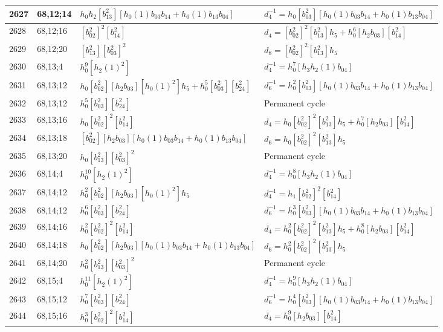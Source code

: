 \documentclass{article}
\begin{document}
\begin{longtable}{|l|l|>{\raggedright\arraybackslash}p{6cm}|>{\raggedright\arraybackslash}p{6cm}|}
\hline
2627 & 68,12;14 & $h_0h_2[b_{13}^2][h_0(1)b_{03}b_{14} + h_0(1)b_{13}b_{04}]$ & $d_{4}^{-1}=h_0[b_{03}^2][h_0(1)b_{03}b_{14} + h_0(1)b_{13}b_{04}]$\\
\hline
2628 & 68,12;16 & $[b_{02}^2]^2[b_{14}^2]$ &$d_{4}=[b_{02}^2]^2[b_{13}^2]h_5 + h_0^6[h_2b_{03}][b_{14}^2]$\\
\hline
2629 & 68,12;20 & $[b_{13}^2][b_{03}^2]^2$ &$d_{8}=[b_{02}^2]^2[b_{13}^2]h_5$\\
\hline
2630 & 68,13;4 & $h_0^9[h_2(1)^2]$ & $d_{4}^{-1}=h_0^7[h_3h_2(1)b_{04}]$\\
\hline
2631 & 68,13;12 & $h_0[b_{02}^2][h_2b_{03}][h_0(1)^2]h_5 + h_0^5[b_{03}^2][b_{24}^2]$ & $d_{6}^{-1}=h_0^2[b_{03}^2][h_0(1)b_{03}b_{14} + h_0(1)b_{13}b_{04}]$\\
2632 & 68,13;12 & $h_0^5[b_{03}^2][b_{24}^2]$ & Permanent cycle\\
\hline
2633 & 68,13;16 & $h_0[b_{02}^2]^2[b_{14}^2]$ &$d_{4}=h_0[b_{02}^2]^2[b_{13}^2]h_5 + h_0^7[h_2b_{03}][b_{14}^2]$\\
\hline
2634 & 68,13;18 & $[b_{02}^2][h_2b_{03}][h_0(1)b_{03}b_{14} + h_0(1)b_{13}b_{04}]$ &$d_{6}=h_0[b_{02}^2]^2[b_{13}^2]h_5$\\
\hline
2635 & 68,13;20 & $h_0[b_{13}^2][b_{03}^2]^2$ & Permanent cycle\\
\hline
2636 & 68,14;4 & $h_0^{10}[h_2(1)^2]$ & $d_{4}^{-1}=h_0^8[h_3h_2(1)b_{04}]$\\
\hline
2637 & 68,14;12 & $h_0^2[b_{02}^2][h_2b_{03}][h_0(1)^2]h_5$ & $d_{4}^{-1}=h_1[b_{02}^2]^2[b_{14}^2]$\\
2638 & 68,14;12 & $h_0^6[b_{03}^2][b_{24}^2]$ & $d_{6}^{-1}=h_0^3[b_{03}^2][h_0(1)b_{03}b_{14} + h_0(1)b_{13}b_{04}]$\\
\hline
2639 & 68,14;16 & $h_0^2[b_{02}^2]^2[b_{14}^2]$ &$d_{4}=h_0^2[b_{02}^2]^2[b_{13}^2]h_5 + h_0^8[h_2b_{03}][b_{14}^2]$\\
\hline
2640 & 68,14;18 & $h_0[b_{02}^2][h_2b_{03}][h_0(1)b_{03}b_{14} + h_0(1)b_{13}b_{04}]$ &$d_{6}=h_0^2[b_{02}^2]^2[b_{13}^2]h_5$\\
\hline
2641 & 68,14;20 & $h_0^2[b_{13}^2][b_{03}^2]^2$ & Permanent cycle\\
\hline
2642 & 68,15;4 & $h_0^{11}[h_2(1)^2]$ & $d_{4}^{-1}=h_0^9[h_3h_2(1)b_{04}]$\\
\hline
2643 & 68,15;12 & $h_0^7[b_{03}^2][b_{24}^2]$ & $d_{6}^{-1}=h_0^4[b_{03}^2][h_0(1)b_{03}b_{14} + h_0(1)b_{13}b_{04}]$\\
\hline
2644 & 68,15;16 & $h_0^3[b_{02}^2]^2[b_{14}^2]$ &$d_{4}=h_0^9[h_2b_{03}][b_{14}^2]$\\

\end{longtable}
\end{document}
